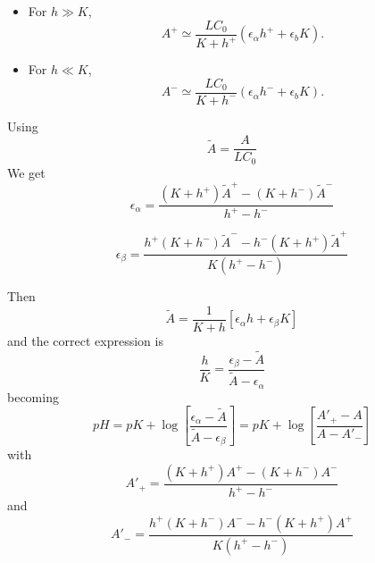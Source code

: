 \documentclass[aps]{revtex4}
\begin{document}
\begin{itemize}
\item For $h\gg K$, 
\begin{equation}
	A^+ \simeq \dfrac{L C_0}{K+h^+} \left( \epsilon_\alpha h^+ + \epsilon_b K\right).
\end{equation}
\item For $h\ll K$,
\begin{equation}
	A^- \simeq \dfrac{L C_0}{K+h^-} \left( \epsilon_\alpha h^- + \epsilon_b K\right).
\end{equation}
\end{itemize}
Using
$$
	\tilde{A} = \dfrac{A}{L C_0}
$$
We get
\begin{equation}
		\epsilon_\alpha = 
		\dfrac
		{
		(K+h^+) \tilde{A}^+ - (K+h^-) \tilde{A}^-
		}
		{
		h^+ - h^-
		} \end{equation}

\begin{equation}
		\epsilon_\beta  = 
		\dfrac
		{
			h^+(K+h^-) \tilde{A}^- - h^-(K+h^+) \tilde{A}^+ 
		}
		{
			K\left(h^+ - h^-\right)
		}
\end{equation}

Then
\begin{equation}
	\tilde{A} = \dfrac{1}{K+h}
	 \left[ 
	 \epsilon_\alpha h + \epsilon_\beta K 
	 \right]
\end{equation}
and the correct expression is
\begin{equation}
	\dfrac{h}{K} 
	=  \dfrac{\epsilon_\beta - \tilde{A}}{\tilde{A}-\epsilon_\alpha}
\end{equation}
becoming
\begin{equation}
pH = pK + \log\left[
\dfrac{\epsilon_\alpha - \tilde{A}
}
{
\tilde{A}-\epsilon_\beta
}
\right] = pK + 
\log\left[ 
\dfrac{A'_{+}-A}{A-A'_{-}}
\right]
\end{equation}
with
\begin{equation}
	A'_{+} = \dfrac
		{
		(K+h^+) {A}^+ - (K+h^-) {A}^-
		}
		{
		h^+ - h^-
		} 
\end{equation}
and
\begin{equation}
A'_{-} =	\dfrac
		{
			h^+(K+h^-) {A}^- - h^-(K+h^+) {A}^+ 
		}
		{
			K\left(h^+ - h^-\right)
		}
\end{equation}
\end{document}

